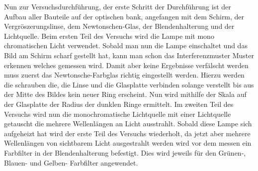 Nun zur Versuchsdurchführung, der erste Schritt der Durchführung ist der Aufbau aller 
Bauteile auf der optischen bank, angefangen mit dem Schirm, der Vergröszerungslinse, dem 
Newtonschen-Glas, der Blendenhalterung und der Lichtquelle. Beim ersten Teil des Versuchs 
wird die Lampe mit mono chromatischen Licht verwendet. Sobald man nun die Lampe einschaltet 
und das Bild am Schirm scharf gestellt hat, kann man schon das Interferenzmuster Muster 
erkennen welches gemessen wird. Damit aber keine Ergebnisse verfälscht werden muss zuerst 
das Newtonsche-Farbglas richtig eingestellt werden. Hierzu werden die schrauben die, die 
Linse und die Glasplatte verbinden solange verstellt bis aus der Mitte des Bildes kein 
neuer Ring erscheint. Nun wird mithilfe der Skala auf der Glasplatte der Radius der dunklen 
Ringe ermittelt. Im zweiten Teil des Versuchs wird nun die monochromatische Lichtquelle mit 
einer Lichtquelle getauscht die mehrere Wellenlängen an Licht ausstrahlt. Sobald diese 
Lampe sich aufgeheizt hat wird der erste Teil des Versuchs wiederholt, da jetzt aber 
mehrere Wellenlängen von sichtbarem Licht ausgestrahlt werden wird vor dem messen ein 
Farbfilter in der Blendenhalterung befestigt. Dies wird jeweils für den Grünen-, Blauen- 
und Gelben- Farbfilter angewendet. 